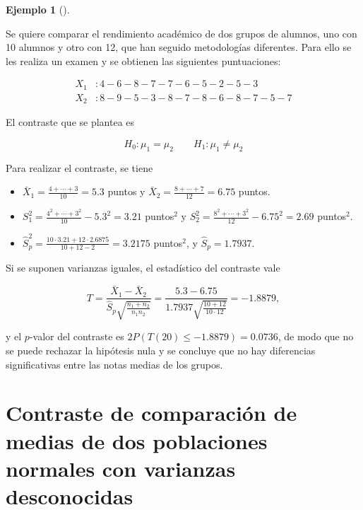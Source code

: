 \documentclass[
  a4paper,
]{scrreport}
\providecommand{\tightlist}{%
  \setlength{\itemsep}{0pt}\setlength{\parskip}{0pt}}\usepackage{longtable,booktabs,array}
\theoremstyle{plain}
\theoremstyle{definition}
\newtheorem{example}{Ejemplo}[chapter]
\theoremstyle{definition}
\theoremstyle{remark}
\begin{document}
\begin{example}[]\protect\hypertarget{exm-contraste-diferencia-medias-normales-varianzas-desconocidas-iguales}{}\label{exm-contraste-diferencia-medias-normales-varianzas-desconocidas-iguales}

Se quiere comparar el rendimiento académico de dos grupos de alumnos,
uno con 10 alumnos y otro con 12, que han seguido metodologías
diferentes. Para ello se les realiza un examen y se obtienen las
siguientes puntuaciones:

\begin{align*}
X_1 &: 4 - 6 - 8 - 7 - 7 - 6 - 5 - 2 - 5 - 3  \\
X_2 &: 8 - 9 - 5 - 3 - 8 - 7 - 8 - 6 - 8 - 7 - 5 - 7
\end{align*}

El contraste que se plantea es

\[
H_0: \mu_1=\mu_2\qquad H_1: \mu_1\neq \mu_2
\]

Para realizar el contraste, se tiene

\begin{itemize}
\tightlist
\item
  \(\bar{X}_1 = \frac{4+\cdots +3}{10}=5.3\) puntos y
  \(\bar{X}_2=\frac{8+\cdots +7}{12}=6.75\) puntos.
\item
  \(S_1^2= \frac{4^2+\cdots + 3^2}{10}-5.3^2=3.21\) puntos\(^2\) y
  \(S_2^2= \frac{8^2+\cdots +3^2}{12}-6.75^2=2.69\) puntos\(^2\).
\item
  \(\hat{S}_p^2 = \frac{10\cdot 3.21+12\cdot 2.6875}{10+12-2}= 3.2175\)
  puntos\(^2\), y \(\hat S_p=1.7937\).
\end{itemize}

Si se suponen varianzas iguales, el estadístico del contraste vale

\[
T=\frac{\bar{X}_1-\bar{X}_2}{\hat{S}_p\sqrt{\frac{n_1+n_2}{n_1n_2}}} = \frac{5.3-6.75}{1.7937\sqrt{\frac{10+12}{10\cdot 12}}} = -1.8879,
\]

y el \(p\)-valor del contraste es \(2P(T(20)\leq -1.8879) = 0.0736\), de
modo que no se puede rechazar la hipótesis nula y se concluye que no hay
diferencias significativas entre las notas medias de los grupos.

\end{example}

\section{Contraste de comparación de medias de dos poblaciones normales
con varianzas
desconocidas}\label{contraste-de-comparaciuxf3n-de-medias-de-dos-poblaciones-normales-con-varianzas-desconocidas}
\end{document}
